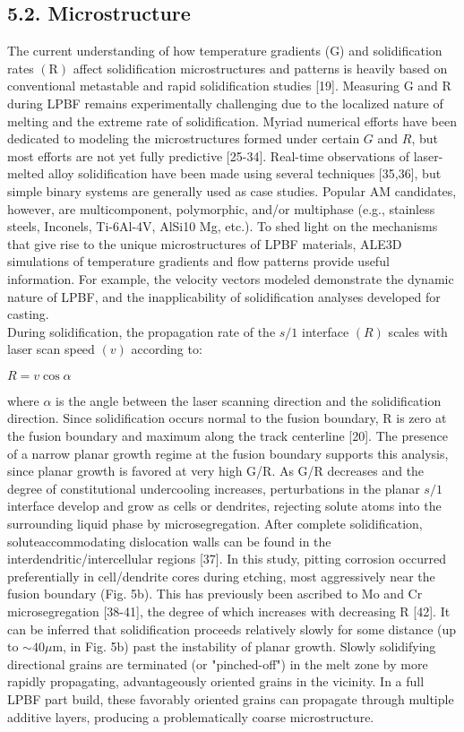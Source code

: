 \documentclass[10pt]{article}
\begin{document}
\subsection*{5.2. Microstructure}
The current understanding of how temperature gradients (G) and solidification rates $(\mathrm{R})$ affect solidification microstructures and patterns is heavily based on conventional metastable and rapid solidification studies [19]. Measuring G and R during LPBF remains experimentally challenging due to the localized nature of melting and the extreme rate of solidification. Myriad numerical efforts have been dedicated to modeling the microstructures formed under certain $G$ and $R$, but most efforts are not yet fully predictive [25-34]. Real-time observations of laser-melted alloy solidification have been made using several techniques [35,36], but simple binary systems are generally used as case studies. Popular AM candidates, however, are multicomponent, polymorphic, and/or multiphase (e.g., stainless steels, Inconels, Ti-6Al-4V, AlSi10 Mg, etc.). To shed light on the mechanisms that give rise to the unique microstructures of LPBF materials, ALE3D simulations of temperature gradients and flow patterns provide useful information. For example, the velocity vectors modeled demonstrate the dynamic nature of LPBF, and the inapplicability of solidification analyses developed for casting.\\
During solidification, the propagation rate of the $s / 1$ interface $(R)$ scales with laser scan speed $(v)$ according to:

$R=v \cos \alpha$

where $\alpha$ is the angle between the laser scanning direction and the solidification direction. Since solidification occurs normal to the fusion boundary, $\mathrm{R}$ is zero at the fusion boundary and maximum along the track centerline [20]. The presence of a narrow planar growth regime at the fusion boundary supports this analysis, since planar growth is favored at very high G/R. As G/R decreases and the degree of constitutional undercooling increases, perturbations in the planar $s / 1$ interface develop and grow as cells or dendrites, rejecting solute atoms into the surrounding liquid phase by microsegregation. After complete solidification, soluteaccommodating dislocation walls can be found in the interdendritic/intercellular regions [37]. In this study, pitting corrosion occurred preferentially in cell/dendrite cores during etching, most aggressively near the fusion boundary (Fig. 5b). This has previously been ascribed to Mo and $\mathrm{Cr}$ microsegregation [38-41], the degree of which increases with decreasing R [42]. It can be inferred that solidification proceeds relatively slowly for some distance (up to $\sim 40 \mu \mathrm{m}$, in Fig. 5b) past the instability of planar growth. Slowly solidifying directional grains are terminated (or "pinched-off") in the melt zone by more rapidly propagating, advantageously oriented grains in the vicinity. In a full LPBF part build, these favorably oriented grains can propagate through multiple additive layers, producing a problematically coarse microstructure.
\end{document}

